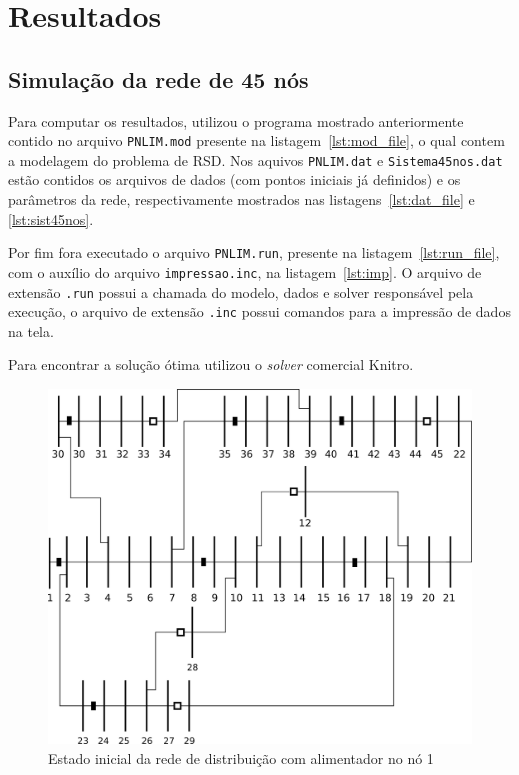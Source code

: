 \section{Resultados}
\subsection{Simulação da rede de 45 nós}

Para computar os resultados, utilizou o programa mostrado anteriormente contido no arquivo \verb|PNLIM.mod| presente na listagem~\ref{lst:mod_file}, o qual contem a modelagem do problema de RSD. 
Nos aquivos \verb|PNLIM.dat| e \verb|Sistema45nos.dat| estão contidos os arquivos de dados (com pontos iniciais já definidos) e os parâmetros da rede, respectivamente mostrados nas listagens~\ref{lst:dat_file} e \ref{lst:sist45nos}.

Por fim fora executado o arquivo \verb|PNLIM.run|, presente na listagem~\ref{lst:run_file}, com o auxílio do arquivo \verb|impressao.inc|, na listagem~\ref{lst:imp}. O arquivo de extensão \verb|.run| possui a chamada do modelo, dados e solver responsável pela execução, o arquivo de extensão \verb|.inc| possui comandos para a impressão de dados na tela.

Para encontrar a solução ótima utilizou o \emph{solver} comercial Knitro.











\begin{figure}[H]
    \centering
    \includegraphics[width=\textwidth]{01_img/rede_inicial.png}
    \caption{Estado inicial da rede de distribuição com alimentador no nó 1}  
    \label{fig:rede_inic}
\end{figure}

